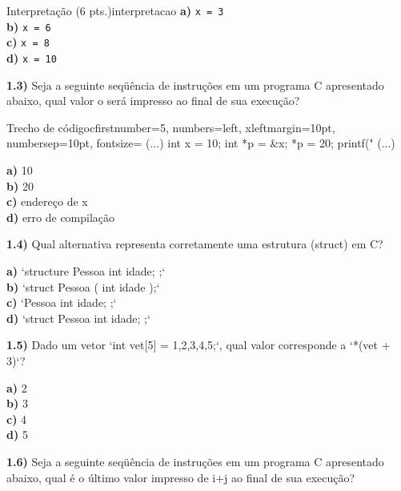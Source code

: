 \begin{problem}{Interpretação (6 pts.)}{interpretacao}
\textbf{a)} \texttt{x = 3}\\
\textbf{b)} \texttt{x = 6}\\
\textbf{c)} \texttt{x = 8}\\
\textbf{d)} \texttt{x = 10}\\

\vspace{0.5em}

\textbf{1.3)} Seja a seguinte seqüência de instruções em um programa C apresentado abaixo, qual valor o será impresso ao final de sua execução?

\begin{mylisting}[enhanced]{Trecho de código}{c}{firstnumber=5, numbers=left, xleftmargin=10pt, numbersep=10pt, fontsize=\small}
(...)
int x = 10;
int *p = &x;
*p = 20;
printf("%
(...)
\end{mylisting}

\textbf{a)} 10\\  
\textbf{b)} 20\\  
\textbf{c)} endereço de x\\  
\textbf{d)} erro de compilação\\  

\vspace{0.5em}

\textbf{1.4)} Qual alternativa representa corretamente uma estrutura (struct) em C?

\textbf{a)} `structure Pessoa { int idade; };`\\  
\textbf{b)} `struct Pessoa ( int idade );`\\  
\textbf{c)} `Pessoa { int idade; };`\\  
\textbf{d)} `struct Pessoa { int idade; };`\\  

\vspace{0.5em}

\textbf{1.5)} Dado um vetor `int vet[5] = {1,2,3,4,5};`, qual valor corresponde a `*(vet + 3)`?

\textbf{a)} 2\\  
\textbf{b)} 3\\  
\textbf{c)} 4\\  
\textbf{d)} 5\\  

\vspace{0.5em}

\textbf{1.6)} Seja a seguinte seqüência de instruções em um programa C apresentado abaixo, qual é o último valor impresso de i+j ao final de sua execução?


\end{problem}
